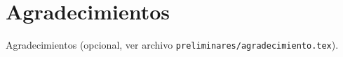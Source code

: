 

\chapter*{Agradecimientos}

Agradecimientos (opcional, ver archivo \texttt{preliminares/agradecimiento.tex}).

\cleardoublepage
\endinput
